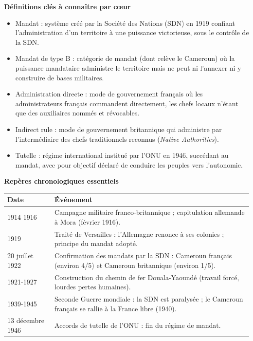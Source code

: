 \documentclass[11pt]{article}
\newcommand{\cle}[1]{{\popxbold\color{popdark}#1}}
\begin{document}
\begin{bilan}
\textbf{Définitions clés à connaître par c\oe ur}
\begin{itemize}
  \item \cle{Mandat} : système créé par la Société des Nations (SDN) en 1919 confiant l'administration d'un territoire à une puissance victorieuse, sous le contrôle de la SDN.
  \item \cle{Mandat de type B} : catégorie de mandat (dont relève le Cameroun) où la puissance mandataire administre le territoire mais ne peut ni l'annexer ni y construire de bases militaires.
  \item \cle{Administration directe} : mode de gouvernement français où les administrateurs français commandent directement, les chefs locaux n'étant que des auxiliaires nommés et révocables.
  \item \cle{Indirect rule} : mode de gouvernement britannique qui administre par l'intermédiaire des chefs traditionnels reconnus (\emph{Native Authorities}).
  \item \cle{Tutelle} : régime international institué par l'ONU en 1946, succédant au mandat, avec pour objectif déclaré de conduire les peuples vers l'autonomie.
\end{itemize}

\textbf{Repères chronologiques essentiels}
\begin{center}
\begin{tabularx}{\linewidth}{|l|X|}
\hline
\rowcolor{popblueL} \textbf{Date} & \textbf{Événement} \\
\hline
1914-1916 & Campagne militaire franco-britannique ; capitulation allemande à Mora (février 1916). \\
\hline
1919 & Traité de Versailles : l'Allemagne renonce à ses colonies ; principe du mandat adopté. \\
\hline
20 juillet 1922 & Confirmation des mandats par la SDN : Cameroun français (environ 4/5) et Cameroun britannique (environ 1/5). \\
\hline
1921-1927 & Construction du chemin de fer Douala-Yaoundé (travail forcé, lourdes pertes humaines). \\
\hline
1939-1945 & Seconde Guerre mondiale : la SDN est paralysée ; le Cameroun français se rallie à la France libre (1940). \\
\hline
13 décembre 1946 & Accords de tutelle de l'ONU : fin du régime de mandat. \\
\hline
\end{tabularx}
\end{center}


\end{bilan}
\end{document}

